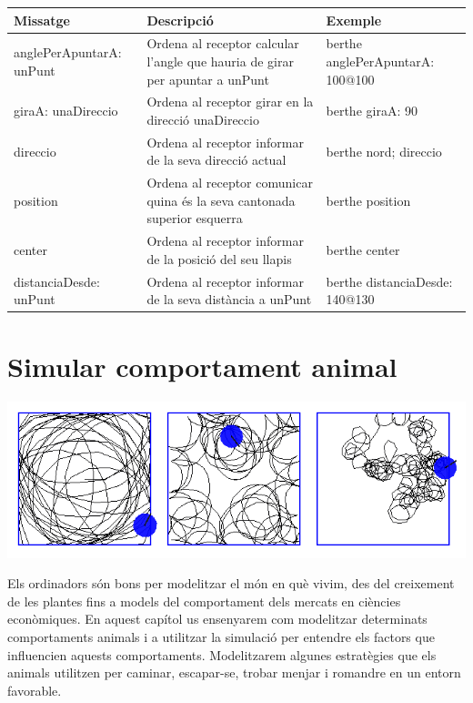 \vspace*{3mm}

\noindent
\setlength{\extrarowheight}{1mm}
{\small \begin{tabular}{p{37mm}p{50mm}p{50mm}}
\hline
\textbf{Missatge} & \textbf{Descripció} & \textbf{Exemple} \\
\hline
\textsf{anglePerApuntarA: unPunt} & 
Ordena al receptor calcular l'angle que hauria de girar per apuntar a \textsf{unPunt} & 
\textsf{berthe anglePerApuntarA: 100@100}\\
\textsf{giraA: unaDireccio} & 
Ordena al receptor girar en la direcció  \textsf{unaDireccio} & 
\textsf{berthe giraA: 90}\\
\textsf{direccio} & 
Ordena al receptor informar de la seva direcció actual & 
\textsf{berthe nord; direccio}\\
\textsf{position} & 
Ordena al receptor comunicar quina és la seva cantonada superior esquerra & 
\textsf{berthe position}\\
\textsf{center} & 
Ordena al receptor informar de la posició del seu llapis & 
\textsf{berthe center}\\
\textsf{distanciaDesde: unPunt} & 
Ordena al receptor informar de la seva distància a \textsf{unPunt} &  
\textsf{berthe distanciaDesde: 140@130}\\
\hline
\end{tabular}}

\chapter{Simular comportament animal}
\label{cap23}

\includegraphics[scale=0.625]{Imatges/figura23-0}

Els ordinadors són bons per modelitzar el món en què vivim, des del creixement de les plantes fins a models del comportament dels mercats en ciències econòmiques. En aquest capítol us ensenyarem com modelitzar determinats comportaments animals i a utilitzar la simulació per entendre els factors que influencien aquests comportaments. Modelitzarem algunes estratègies que els animals utilitzen per caminar, escapar-se, trobar menjar i romandre en un entorn favorable. 

